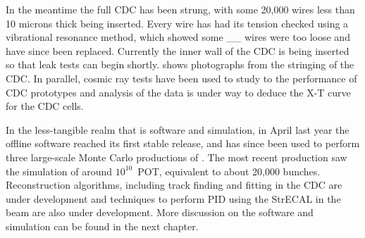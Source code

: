 In the meantime the full \ac{CDC} has been strung, with some 20,000 wires less than 10 microns thick  being inserted.
Every wire has had its tension checked using a vibrational resonance method, which showed some \_\_  wires were too loose and have since been replaced.
Currently the inner wall of the CDC is being inserted so that leak tests can begin shortly.  
 shows photographs from the stringing of the \ac{CDC}.
In parallel, cosmic ray tests have been used to study to the performance of CDC prototypes and analysis of the data is under way to deduce the X-T curve for the CDC cells.

In the less-tangible realm that is software and simulation, in April last year the offline software reached its first stable release, and has since been used to perform three large-scale Monte Carlo productions of \phaseI.
The most recent production saw the simulation of around $10^{10}$~\ac{POT}, equivalent to about 20,000 bunches.  
Reconstruction algorithms, including track finding and fitting in the \ac{CDC} are under development and techniques to perform \ac{PID} using the \ac{StrECAL} in the \phaseI beam are also under development.
More discussion on the software and simulation can be found in the next chapter.
